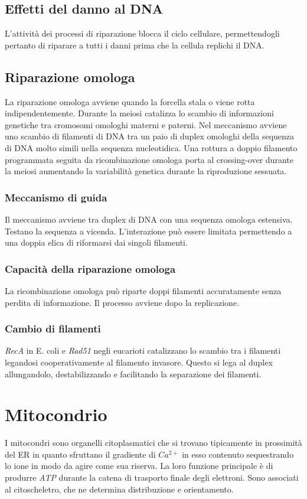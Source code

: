 	\subsection{Effetti del danno al DNA}
	L'attivit\`a dei processi di riparazione blocca il ciclo cellulare, permettendogli pertanto di riparare a tutti i danni prima che la cellula replichi il DNA.

	\subsection{Riparazione omologa}
	La riparazione omologa avviene quando la forcella stala o viene rotta indipendentemente.
	Durante la meiosi catalizza lo scambio di informazioni genetiche tra cromosomi omologhi materni e paterni.
	Nel meccanismo avviene uno scambio di filamenti di DNA tra un paio di duplex omologhi della sequenza di DNA molto simili nella sequenza nucleotidica.
	Una rottura a doppio filamento programmata seguita da ricombinazione omologa porta al crossing-over durante la meiosi aumentando la variabilit\`a genetica durante la riproduzione sessuata.

		\subsubsection{Meccanismo di guida}
		Il meccanismo avviene tra duplex di DNA con una sequenza omologa estensiva.
		Testano la sequenza a vicenda.
		L'interazione pu\`o essere limitata permettendo a una doppia elica di riformarsi dai singoli filamenti.

		\subsubsection{Capacit\`a della riparazione omologa}
		La ricombinazione omologa pu\`o riparte doppi filamenti accuratamente senza perdita di informazione.
		Il processo avviene dopo la replicazione.

		\subsubsection{Cambio di filamenti}
		\emph{RecA} in E. coli e \emph{Rad51} negli eucarioti catalizzano lo scambio tra i filamenti legandosi cooperativamente al filamento invasore.
		Questo si lega al duplex allungandolo, destabilizzando e facilitando la separazione dei filamenti.

\section{Mitocondrio}
I mitocondri sono organelli citoplasmatici che si trovano tipicamente in prossimit\`a del ER in quanto sfruttano il gradiente di \emph{$Ca^{2+}$} in esso contenuto sequestrando lo ione in modo da agire come sua riserva.
La loro funzione principale \`e di produrre \emph{ATP} durante la catena di trasporto finale degli elettroni.
Sono associati al citoscheletro, che ne determina distribuzione e orientamento.

